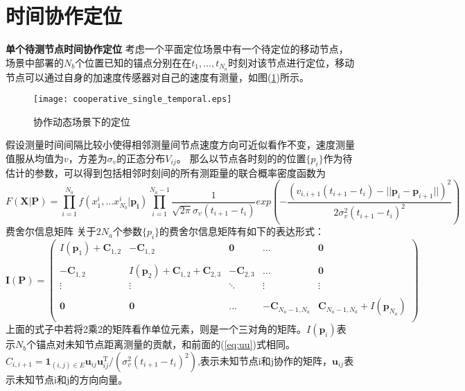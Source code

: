 \section[时间协作定位]{时间协作定位}\label{section:temporal_cooperative_localization}

\textbf{单个待测节点时间协作定位}
考虑一个平面定位场景中有一个待定位的移动节点，场景中部署的$N_b$个位置已知的锚点分别在在$t_1,\dots,t_{N_a}$时刻对该节点进行定位，移动节点可以通过自身的加速度传感器对自己的速度有测量，如图(\ref{fig:cooperative_single_temporal})所示。
        \begin{figure}
          \centering
          \texttt{[image: cooperative\_single\_temporal.eps]}
          \caption{协作动态场景下的定位}\label{fig:cooperative_single_temporal}
        \end{figure}

假设测量时间间隔比较小使得相邻测量间节点速度方向可近似看作不变，速度测量值服从均值为$v$，方差为$\sigma_{v}$的正态分布$V_{ij}$。
那么以节点各时刻的的位置$\{p_i\}$作为待估计的参数，可以得到包括相邻时刻间的所有测距量的联合概率密度函数为
\begin{equation}
F(\bm{X}|\bm{P})=\prod_{i=1}^{N_a} f(x^i_1,...x^{i}_{N_b}|\bm{p_i})
\prod_{i=1}^{N_a-1}\frac{1}{\sqrt{2\pi}\sigma_v(t_{i+1}-t_i)}
exp\left(-\frac{(v_{i,i+1}(t_{i+1}-t_i)-||\bm{p}_i-\bm{p}_{i+1}||)^2}{2\sigma_v^2(t_{i+1}-t_i)^2}\right)
\end{equation}
{费舍尔信息矩阵}
关于$2N_a$个参数$\{p_i\}$的费舍尔信息矩阵有如下的表达形式：
\begin{equation}\label{eq:time_cooperation_matrix}
\bm{I}(\bm{P})=
\left(
\begin{array}{ccccc}
I(\bm{p}_1)+\bm{C}_{1,2}&-\bm{C}_{1,2}&\bm{0}&\dots&\bm{0}\\
&&&&\\
-\bm{C}_{1,2} & I(\bm{p}_2)+\bm{C}_{1,2}+\bm{C}_{2,3}&-\bm{C}_{2,3}&\dots&\bm{0}\\
\vdots &\vdots&\ddots &\vdots&\vdots\\
&&&&\\
\bm{0}&\bm{0}&...& -\bm{C}_{N_a-1,N_a}&\bm{C}_{N_a-1,N_a}+I(\bm{p}_{N_a})\\
\end{array}
\right)
\end{equation}
上面的式子中若将2乘2的矩阵看作单位元素，则是一个三对角的矩阵。$I(\bm{p}_i)$表示$N_b$个锚点对未知节点距离测量的贡献，和前面的(\ref{eq:uu})式相同。$C_{i,i+1}=\bm{1}_{(i,j)\in E}\bm{u}_{ij}\bm{u}_{ij}^{\textrm{T}} /(\sigma_v^2(t_{i+1}-t_i)^2)$,表示未知节点i和j协作的矩阵，$\bm{u}_{ij}$表示未知节点i和j的方向向量。


